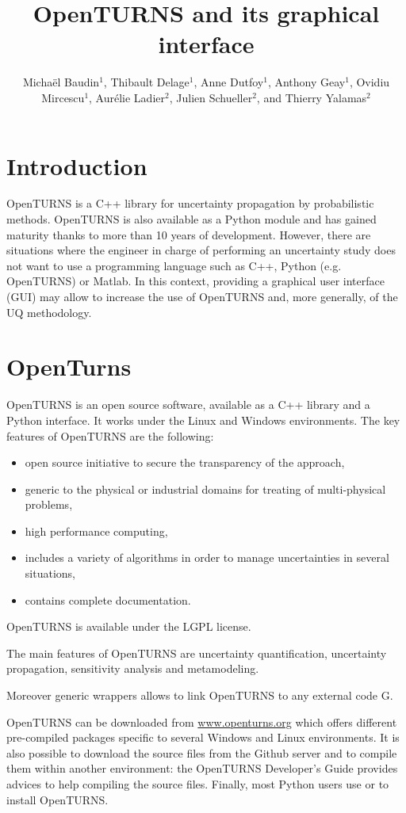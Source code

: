 \documentclass{uncecomp2019}
\title{OpenTURNS and its graphical interface}
\author{Michaël Baudin$^1$, Thibault Delage$^1$, Anne Dutfoy$^1$, 
Anthony Geay$^1$, Ovidiu Mircescu$^1$, 
Aurélie Ladier$^2$, Julien Schueller$^2$, and Thierry Yalamas$^2$}
\begin{document}

\section{Introduction}

OpenTURNS is a C++ library for uncertainty propagation by probabilistic 
methods. 
OpenTURNS is also available as a Python module and has gained maturity thanks to more 
than 10 years of development. 
However, there are situations where the engineer in charge of 
performing an uncertainty study does not want to use a programming language such as C++, Python 
(e.g. OpenTURNS) or Matlab. 
In this context, providing a graphical user interface (GUI) may allow 
to increase the use of OpenTURNS and, more generally, of the UQ methodology.



\section{OpenTurns}

OpenTURNS\cite{Baudin2016,OTurl,OpenTURNSUncecomp17} is an open source software, available as a 
C++ library and a Python interface. 
It works under the Linux and Windows environments. 
The key features of OpenTURNS are the following:
\begin{itemize}
\item open source initiative to secure the transparency of the approach,
\item generic to the physical or industrial domains for treating of multi-physical problems,
\item high performance computing,
\item includes a variety of algorithms in order to manage uncertainties in several situations,
\item contains complete documentation.
\end{itemize}
OpenTURNS is available under the LGPL license. 

The main features of OpenTURNS are uncertainty quantification, uncertainty propagation, 
sensitivity analysis and metamodeling. 

Moreover generic wrappers allows to link OpenTURNS to any external code G.

OpenTURNS can be downloaded from \url{www.openturns.org} which offers different 
pre-compiled packages specific to several Windows and Linux environments. 
It is also possible to download the source files from the Github server and to compile them within another 
environment: the OpenTURNS Developer's Guide provides advices to help compiling the source files. 
Finally, most Python users use  or  to install OpenTURNS.
\end{document}
